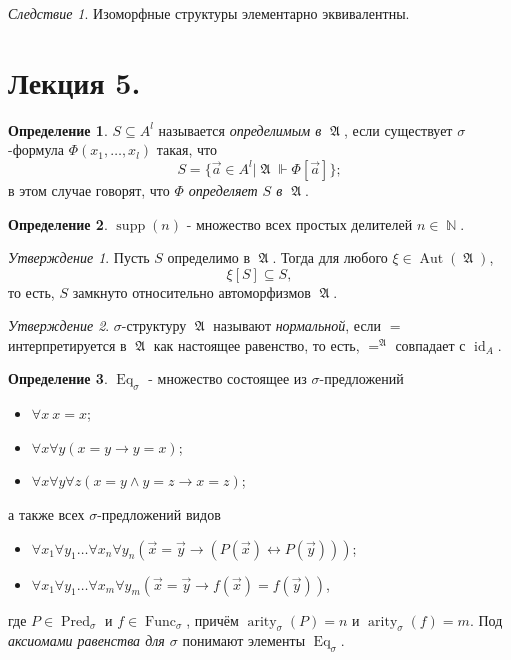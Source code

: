 \documentclass[a4paper,100pt]{article}
\theoremstyle{indented}
\theoremstyle{definition}
\newtheorem{defn}{Определение}
\theoremstyle{remark}
\newtheorem{cons}{Следствие}
\newtheorem{stat}{Утверждение}
\DeclareMathOperator{\ra}{\rightarrow}
\DeclareMathOperator{\id}{id}
\DeclareMathOperator{\NN}{\mathbb{N}}
\DeclareMathOperator{\Pred}{Pred}
\DeclareMathOperator{\Func}{Func}
\DeclareMathOperator{\arity}{arity}
\DeclareMathOperator{\Aut}{Aut}
\DeclareMathOperator{\supp}{supp}
\DeclareMathOperator{\Eq}{Eq}
\DeclareMathOperator{\GA}{\mathfrak{A}}
\begin{document}
\begin{cons}
  Изоморфные структуры элементарно эквивалентны.
\end{cons}

\section{Лекция 5.}

\begin{defn}
  $S\subseteq A^l$ называется \textit{определимым в $\GA$}, если существует $\sigma$-формула $\Phi(x_1, \ldots, x_l)$ такая, что 
  \[
    S=\{\vec{a}\in A^l|\GA\Vdash \Phi[\vec{a}]\}; 
  \]
  в этом случае говорят, что \textit{$\Phi$ определяет $S$ в $\GA$}. 
\end{defn}

\begin{defn}
  $\supp(n)$ - множество всех простых делителей $n\in \NN$. 
\end{defn}

\begin{stat}
  Пусть $S$ определимо в $\GA$. Тогда для любого $\xi\in \Aut(\GA)$, 
  \[
    \xi[S]\subseteq S, 
  \]
  то есть, $S$ замкнуто относительно автоморфизмов $\GA$. 
\end{stat}

\begin{stat}
  $\sigma$-структуру $\GA$ называют \textit{нормальной}, если $=$ интерпретируется в $\GA$ как настоящее равенство, то есть, $=^{\GA}$ совпадает с $\id_A$.
\end{stat}

\begin{defn}
  $\Eq_\sigma$ - множество состоящее из $\sigma$-предложений

  \begin{itemize}
    \item $\forall x \: x=x$; 
    \item $\forall x \forall y (x=y\ra y=x)$; 
    \item $\forall x \forall y \forall z (x=y \wedge y=z \ra x=z)$;
  \end{itemize}
  а также всех $\sigma$-предложений видов 

  \begin{itemize}
    \item $\forall x_1 \forall y_1 \ldots \forall x_n \forall y_n (\vec{x}=\vec{y}\ra (P(\vec{x})\leftrightarrow P(\vec{y})))$; 
    \item $\forall x_1 \forall y_1 \ldots \forall x_m \forall y_m (\vec{x}=\vec{y}\ra f(\vec{x}) = f(\vec{y}))$, 
  \end{itemize}
  где $P\in \Pred_\sigma$ и $f\in \Func_\sigma$, причём $\arity_\sigma(P)=n$ и $\arity_\sigma(f)=m$. Под \textit{аксиомами равенства для $\sigma$} понимают элементы $\Eq_\sigma$. 
\end{defn}
\end{document}
